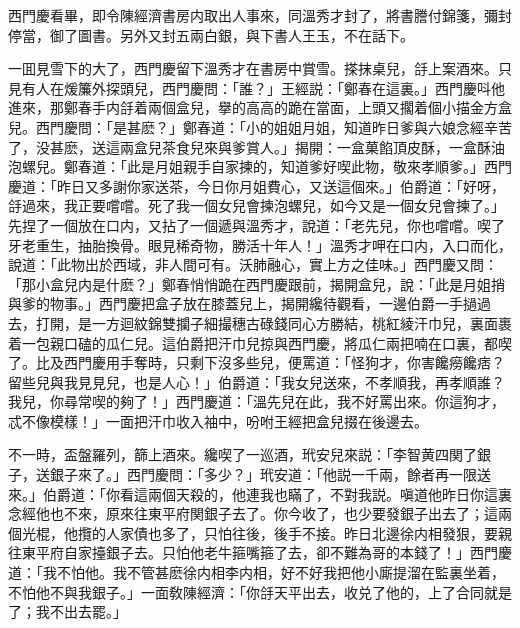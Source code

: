 西門慶看畢，即令陳經濟書房内取出人事來，同溫秀才封了，將書謄付錦箋，彌封停當，御了圖書。另外又封五兩白銀，與下書人王玉，不在話下。

一囬見雪下的大了，西門慶留下溫秀才在書房中賞雪。搽抹桌兒，㧱上案酒來。只見有人在煖簾外探頭兒，西門慶問：「誰？」王經説：「鄭春在這裏。」西門慶呌他進來，那鄭春手内㧱着兩個盒兒，擧的高高的跪在當面，上頭又擱着個小描金方盒兒。西門慶問：「是甚麽？」鄭春道：「小的姐姐月姐，知道昨日爹與六娘念經辛苦了，没甚麽，送這兩盒兒茶食兒來與爹賞人。」揭開：一盒菓餡頂皮酥，一盒酥油泡螺兒。鄭春道：「此是月姐親手自家揀的，知道爹好喫此物，敬來孝順爹。」西門慶道：「昨日又多謝你家送茶，今日你月姐費心，又送這個來。」伯爵道：「好呀，㧱過來，我正要嚐嚐。死了我一個女兒會揀泡螺兒，如今又是一個女兒會揀了。」先捏了一個放在口内，又拈了一個遞與溫秀才，說道：「老先兒，你也嚐嚐。喫了牙老重生，抽胎換骨。眼見稀奇物，勝活十年人！」溫秀才呷在口内，入口而化，說道：「此物出於西域，非人間可有。沃肺融心，實上方之佳味。」西門慶又問：「那小盒兒内是什麽？」鄭春悄悄跪在西門慶跟前，揭開盒兒，說：「此是月姐捎與爹的物事。」西門慶把盒子放在膝蓋兒上，揭開纔待觀看，一邊伯爵一手撾過去，打開，是一方迴紋錦雙攔子細撮穗古碌錢同心方勝結，桃紅綾汗巾兒，裏面裹着一包親口磕的瓜仁兒。這伯爵把汗巾兒掠與西門慶，將瓜仁兩把喃在口裏，都喫了。比及西門慶用手奪時，只剩下沒多些兒，便罵道：「怪狗才，你害饞癆饞痞？留些兒與我見見兒，也是人心！」伯爵道：「我女兒送來，不孝順我，再孝順誰？我兒，你尋常喫的夠了！」西門慶道：「溫先兒在此，我不好罵出來。你這狗才，忒不像模樣！」一面把汗巾收入袖中，吩咐王經把盒兒掇在後邊去。

不一時，盃盤羅列，篩上酒來。纔喫了一巡酒，玳安兒來説：「李智黄四関了銀子，送銀子來了。」西門慶問：「多少？」玳安道：「他説一千兩，餘者再一限送來。」伯爵道：「你看這兩個天殺的，他連我也瞞了，不對我説。嗔道他昨日你這裏念經他也不來，原來往東平府関銀子去了。你今收了，也少要發銀子出去了；這兩個光棍，他攬的人家債也多了，只怕往後，後手不接。昨日北邊徐内相發狠，要親往東平府自家擡銀子去。只怕他老牛箍嘴箍了去，卻不難為哥的本錢了！」西門慶道：「我不怕他。我不管甚麽徐内相李内相，好不好我把他小廝提溜在監裏坐着，不怕他不與我銀子。」一面敎陳經濟：「你㧱天平出去，收兑了他的，上了合同就是了；我不出去罷。」

